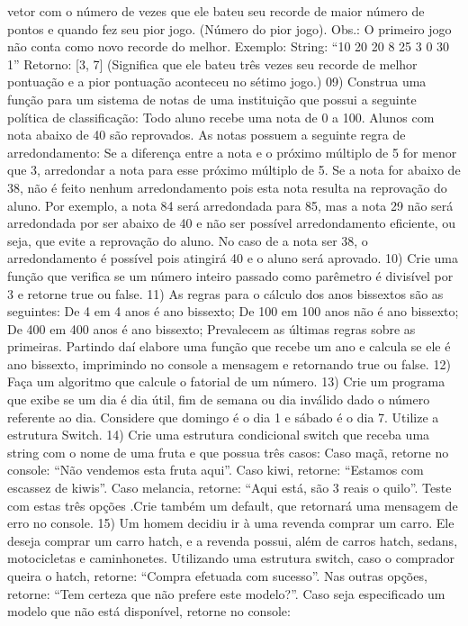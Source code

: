 vetor com o número de vezes que ele bateu seu recorde de maior número de pontos e quando fez seu pior
jogo. (Número do pior jogo).
Obs.: O primeiro jogo não conta como novo recorde do melhor.
Exemplo:
String: “10 20 20 8 25 3 0 30 1”
Retorno: [3, 7] (Significa que ele bateu três vezes seu recorde de melhor pontuação e a pior pontuação
aconteceu no sétimo jogo.)
09) Construa uma função para um sistema de notas de uma instituição que possui a seguinte política de
classificação: Todo aluno recebe uma nota de 0 a 100. Alunos com nota abaixo de 40 são reprovados. As notas
possuem a seguinte regra de arredondamento: Se a diferença entre a nota e o próximo múltiplo de 5 for menor
que 3, arredondar a nota para esse próximo múltiplo de 5. Se a nota for abaixo de 38, não é feito nenhum
arredondamento pois esta nota resulta na reprovação do aluno. Por exemplo, a nota 84 será arredondada para
85, mas a nota 29 não será arredondada por ser abaixo de 40 e não ser possível arredondamento eficiente, ou
seja, que evite a reprovação do aluno. No caso de a nota ser 38, o arredondamento é possível pois atingirá 40
e o aluno será aprovado.
10) Crie uma função que verifica se um número inteiro passado como parêmetro é divisível por 3 e retorne true
ou false.
11) As regras para o cálculo dos anos bissextos são as seguintes:
De 4 em 4 anos é ano bissexto;
De 100 em 100 anos não é ano bissexto;
De 400 em 400 anos é ano bissexto;
Prevalecem as últimas regras sobre as primeiras.
Partindo daí elabore uma função que recebe um ano e calcula se ele é ano bissexto, imprimindo no console a
mensagem e retornando true ou false.
12) Faça um algoritmo que calcule o fatorial de um número.
13) Crie um programa que exibe se um dia é dia útil, fim de semana ou dia inválido dado o número referente ao
dia. Considere que domingo é o dia 1 e sábado é o dia 7. Utilize a estrutura Switch.
14) Crie uma estrutura condicional switch que receba uma string com o nome de uma fruta e que possua três
casos: Caso maçã, retorne no console: “Não vendemos esta fruta aqui”. Caso kiwi, retorne: “Estamos com
escassez de kiwis”. Caso melancia, retorne: “Aqui está, são 3 reais o quilo”. Teste com estas três opções .Crie
também um default, que retornará uma mensagem de erro no console.
15) Um homem decidiu ir à uma revenda comprar um carro. Ele deseja comprar um carro hatch, e a revenda
possui, além de carros hatch, sedans, motocicletas e caminhonetes. Utilizando uma estrutura switch, caso o
comprador queira o hatch, retorne: “Compra efetuada com sucesso”. Nas outras opções, retorne: “Tem certeza
que não prefere este modelo?”. Caso seja especificado um modelo que não está disponível, retorne no console:
